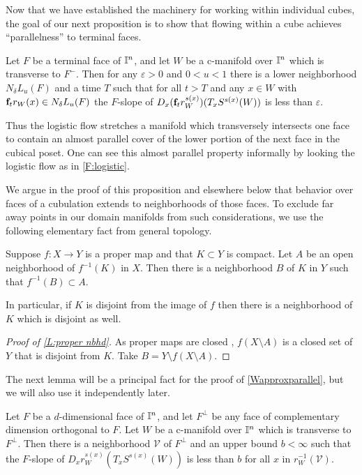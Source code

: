  Now that we have established the machinery for working within individual cubes, the goal of our next proposition is to show that flowing within a cube achieves ``parallelness'' to terminal faces.

\begin{proposition}\label{Wapproxparallel}
	Let $F$ be a terminal face of $\mathbb{I}^n$, and let $W$ be a c-manifold over $\mathbb{I}^n$ which is transverse to $F^-$.  Then for any $\varepsilon > 0$ and $0 < u < 1$ there is a lower neighborhood $N_\delta L_u(F)$ and a time $T$ such that for all $t > T$ and any $x \in W$ with $\mathbf{f}_t r_W(x) \in N_\delta L_u(F)$ the $F$-slope of  $D_x(\mathbf{f}_tr^{s(x)}_W)(T_xS^{s(x)}(W))$ is less than $\varepsilon$.
\end{proposition}

Thus the logistic flow stretches a manifold which transversely intersects one face to contain
an almost parallel cover of the lower portion of the next face in the cubical poset.  One can see
this almost parallel property informally by looking the logistic flow as in \cref{F:logistic}.

We argue in the proof of this proposition and elsewhere below that behavior over faces of a cubulation
extends to neighborhoods of those faces.
To exclude far away points in our  domain manifolds from such considerations, we use the following elementary fact from general topology.

\begin{lemma}\label{L:proper nbhd}
	Suppose $f \colon X \to Y$ is a proper map and that $K \subset Y$ is compact.
	Let $A$ be an open neighborhood of $f^{-1}(K)$ in $X$.
	Then there is a neighborhood $B$ of $K$ in $Y$ such that $f^{-1}(B) \subset A$.
\end{lemma}

	In particular, if $K$ is disjoint from the image of $f$ then there is a neighborhood of $K$ which is disjoint as well.

\begin{proof}[Proof of \cref{L:proper nbhd}]
	As proper maps are closed \cite[Proposition I.10.1.1]{Bou98}, $f(X \setminus A)$ is a closed set of $Y$ that is disjoint from $K$.
	Take $B = Y \setminus f(X \setminus A)$.
\end{proof}

The next lemma will be a principal fact for the proof of \cref{Wapproxparallel}, but we will also use it independently later.


\begin{lemma}\label{L:Fslopebounded}
	Let $F$ be a $d$-dimensional face of $\mathbb{I}^n$, and let $F^\perp$ be any face of complementary dimension orthogonal to $F$.
	Let $W$ be a c-manifold over $\mathbb{I}^n$ which is transverse to $F^\perp$.
	Then there is a neighborhood $\mathcal{V}$ of $F^\perp$ and an upper bound $b < \infty$ such that
	the $F$-slope of $D_xr^{s(x)}_W(T_xS^{s(x)}(W))$ is less than $b$ for all $x$ in $r_W^{-1}(\mathcal{V})$.
\end{lemma}

